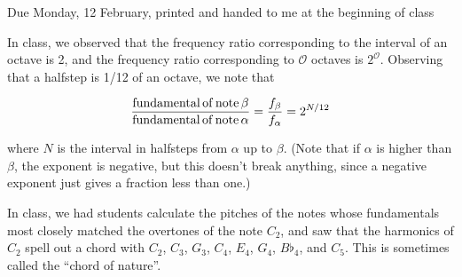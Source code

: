 \documentclass[12pt]{article}
\begin{document}
\Large
\centerline{}
\centerline{\large Due Monday, 12 February, printed and handed to me at the beginning of class}
\normalsize

\bigskip
\bigskip

   In class, we observed that the frequency ratio corresponding to the interval of an octave is 2, and the frequency ratio corresponding to $\mathcal O$ octaves is $2^\mathcal O$.
    Observing that a halfstep is 1/12 of an octave, we note that 

    $$\frac{\rm fundamental\,of\,note\,\beta}{\rm fundamental\,of\,note\,\alpha} = \frac{f_\beta}{f_\alpha} = 2^{N/12}$$

    where $N$ is the interval in halfsteps from $\alpha$ up to $\beta$. (Note that if $\alpha$ is higher than $\beta$, the exponent is negative, but this doesn't break anything,
    since a negative exponent just gives a fraction less than one.)


   In class, we had students calculate the pitches of the notes whose fundamentals most closely matched the overtones of the note $C_2$, and saw that the harmonics of $C_2$
    spell out a chord with $C_2$, $C_3$, $G_3$, $C_4$, $E_4$, $G_4$, $B\flat_4$, and $C_5$. This is sometimes called the ``chord of nature''.

  
\end{document}
